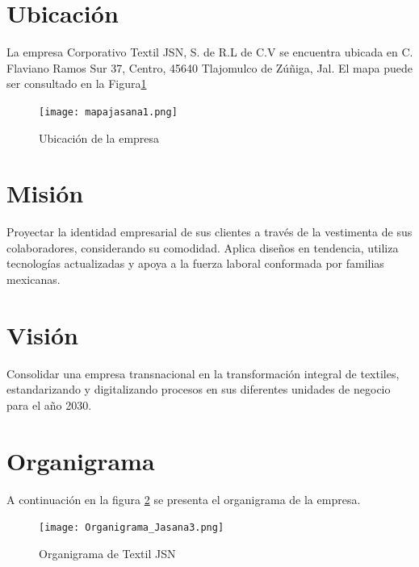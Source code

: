 \documentclass[12pt,letterpaper,spanish]{report}
\begin{document}

\section{Ubicación}
La empresa Corporativo Textil JSN, S. de R.L de C.V se encuentra ubicada en C. Flaviano Ramos Sur 37, Centro, 45640 Tlajomulco de Zúñiga, Jal. El mapa puede ser consultado en la Figura\ref{a01}

\begin{figure}[htp]
  \centering
  \texttt{[image: mapajasana1.png]}
  \caption{Ubicación de la empresa}\label{a01}
\end{figure}




\section{Misión}
Proyectar la identidad empresarial de sus clientes a través de la vestimenta de sus colaboradores, considerando su comodidad. Aplica diseños en tendencia, utiliza tecnologías actualizadas y apoya a la fuerza laboral conformada por familias mexicanas.

\section{Visión}
Consolidar una empresa transnacional en la transformación integral de textiles, estandarizando y digitalizando procesos en sus diferentes unidades de negocio para el año 2030.

\section{Organigrama}
A continuación en la figura \ref{a2} se presenta el organigrama de la empresa.

\begin{figure}[htp]
  \centering
  \texttt{[image: Organigrama\_Jasana3.png]}
  \caption{Organigrama de Textil JSN}\label{a2}
\end{figure}
\end{document}
